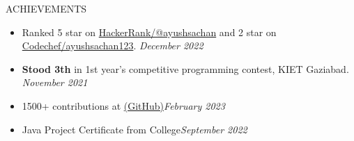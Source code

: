\documentclass{resume} %
\begin{document}
\begin{rSection}{ACHIEVEMENTS} 
\begin{itemize}
 \item Ranked 5 star on \href{https://www.hackerrank.com/ayushsachan_in}{HackerRank/@ayushsachan} and 2 star on \href{https://www.codechef.com/users/ayushsachan123}{Codechef/ayushsachan123}. \hfill \textit{December 2022}
 \item \textbf{Stood 3th} in 1st year’s competitive programming contest, KIET Gaziabad. \hfill \textit{November 2021}
 \item 1500+ contributions at \href{https://github.com/ayushsachan123}{(GitHub)}\hfill \textit{February 2023}
 \item Java Project Certificate from College\hfill \textit{September 2022}
\end{itemize}


\end{rSection}
\end{document}
